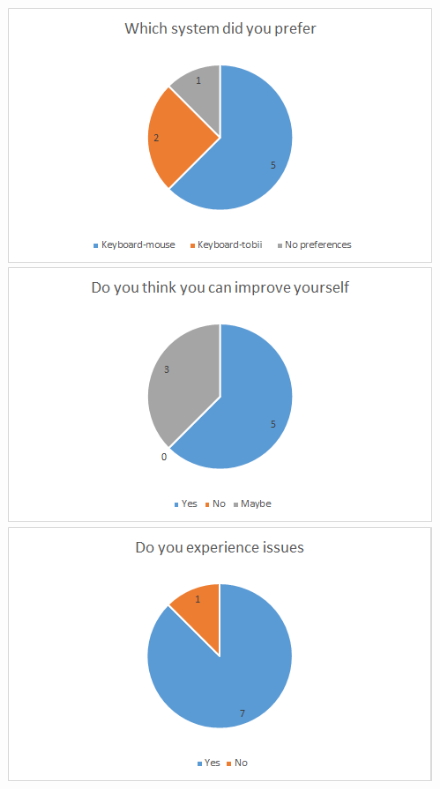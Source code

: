 \documentclass[12pt, a4paper]{article}
\begin{document}
\begin{figure}[H]
\includegraphics[scale =.59]{Preference}
\includegraphics[scale =.59]{Improvement}
\includegraphics[scale =.59]{Issues}
\end{figure}

\end{document}

